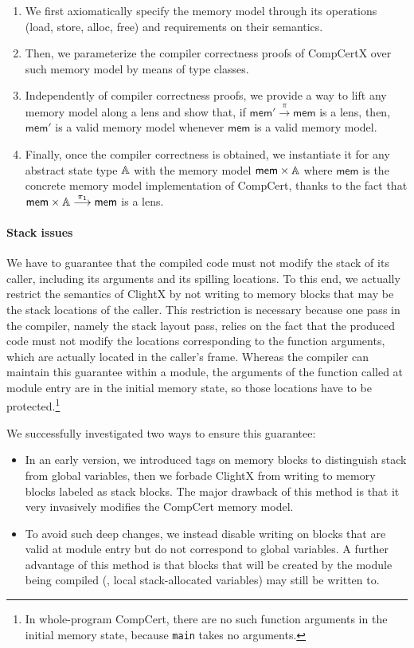 \begin{enumerate}
\item We first axiomatically specify the memory model through its
  operations (load, store, alloc, free) and requirements on their
  semantics.
\item Then, we parameterize the compiler correctness proofs of
  CompCertX over such memory model by means of type classes.
\item Independently of compiler correctness proofs, we provide a
  way to lift any memory model along a lens and show that, if 
  $\textsf{mem}'
  \stackrel{\pi}{\longrightarrow} \textsf{mem}$ is a lens, then, $\textsf{mem}'$ is a valid
  memory model whenever $\textsf{mem}$ is a valid memory model.
\item Finally, once the compiler correctness is obtained, we
  instantiate it for any abstract state type $\mathbb{A}$ with the memory model $\textsf{mem} \times \mathbb{A}$
  where $\textsf{mem}$ is the concrete memory model implementation of CompCert,
  thanks to the fact that $\textsf{mem} \times \mathbb{A}
  \stackrel{\pi_1}{\longrightarrow} \textsf{mem}$ is a lens.
\end{enumerate}


\paragraph{Stack issues} 
We have to guarantee that the compiled code must not modify the stack
of its caller, including its arguments and its spilling locations. To
this end, we actually restrict the semantics of ClightX by not writing
to memory blocks that may be the stack locations of the caller.  This
restriction is necessary because one pass in the compiler, namely the
stack layout pass, relies on the fact that the produced code must not
modify the locations corresponding to the function arguments, which
are actually located in the caller's frame. Whereas the compiler
can maintain this guarantee within a module, the arguments of the
function called at module entry are in the initial memory state, so
those locations have to be protected.\footnote{In whole-program
  CompCert, there are no such function arguments in the initial memory
  state, because \texttt{main} takes no arguments.}

We successfully investigated two ways to ensure this guarantee:
\begin{itemize}
\item In an early version, we introduced tags on memory blocks to
  distinguish stack from global variables, then we forbade ClightX
  from writing to memory blocks labeled as stack blocks. The major
  drawback of this method is that it very invasively modifies the
  CompCert memory model.
\item To avoid such deep changes, we instead disable writing on blocks
  that are valid at module entry but do not correspond to global
  variables. A further advantage of this method is that blocks that will be
  created by the module being compiled (\eg, local stack-allocated
  variables) may still be written to.
\end{itemize}


